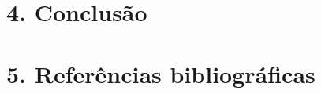 \documentclass[12pt, a4paper]{article}
\begin{document}
\section*{4. Conclusão}


\section*{5. Referências bibliográficas}
\end{document}
